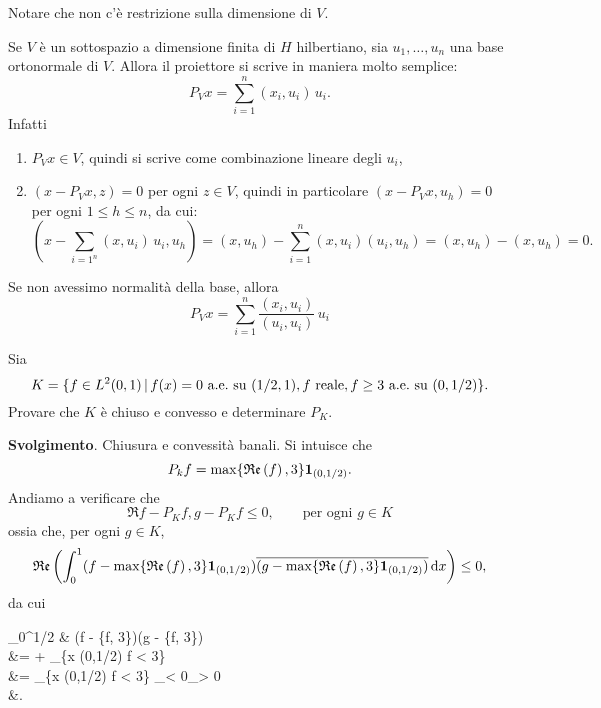 \begin{remark}
	Notare che non c'è restrizione sulla dimensione di $V$.
\end{remark}

\begin{remark}
	Se $V$ è un sottospazio a dimensione finita di $H$ hilbertiano, sia $u_1, \ldots, u_n$ una base ortonormale di $V$. Allora il proiettore si scrive in maniera molto semplice:
	\begin{equation*}
		P_V x = \sum_{i=1}^n (x_i, u_i)\,u_i.
	\end{equation*}
	Infatti
	\begin{enumerate}
		\item $P_V x \in V$, quindi si scrive come combinazione lineare degli $u_i$,
		\item $(x-P_V x, z) = 0$ per ogni $z \in V$, quindi in particolare $(x-P_V x, u_h) = 0$ per ogni $1 \leq h \leq n$, da cui:
		\begin{equation*}
			(x- {\textstyle \sum_{i=1^n}} (x,u_i)\,u_i, u_h) = (x, u_h) - \sum_{i=1}^n (x,u_i)(u_i, u_h) = (x,u_h) - (x, u_h) = 0.
		\end{equation*}
	\end{enumerate}
	Se non avessimo normalità della base, allora
	\begin{equation*}
		P_V x = \sum_{i=1}^n \frac{(x_i, u_i)}{(u_i, u_i)}\,u_i
	\end{equation*}
\end{remark}

\begin{exercise}
	Sia
	\begin{equation*}
		K = \{f \in L^2(0,1) \,|\, f(x) = 0 \ \text{a.e.}\ \text{su $(1/2,1)$}, \text{$f$ reale}, f\geq 3 \ \text{a.e.}\ \text{su $(0,1/2)$}\}.
	\end{equation*}
	Provare che $K$ è chiuso e convesso e determinare $P_K$.

	\textbf{Svolgimento}.
	Chiusura e convessità banali. Si intuisce che
	\begin{equation*}
		P_k f = \max\{\mathfrak{Re}\left(f\right), 3\}{\boldsymbol{1}}_{(0,1/2)}.
	\end{equation*}
	Andiamo a verificare che
	\begin{equation*}
		\Re{f-P_K f, g - P_K f} \leq 0, \qquad \text{per ogni $g \in K$}
	\end{equation*}
	ossia che, per ogni $g \in K$,
	\begin{equation*}
		\mathfrak{Re}\left(\int_0^1 (f- \max\{\mathfrak{Re}\left(f\right), 3\}{\boldsymbol{1}}_{(0,1/2)}) \overline{(g- \max\{\mathfrak{Re}\left(f\right), 3\}{\boldsymbol{1}}_{(0,1/2)})}\,\mathrm{d} x\right) \leq 0,
	\end{equation*}
	da cui
	\begin{eqalign*}
		\int_0^{1/2} & (\Re f - \max \{\Re f, 3\})(g - \max\{\Re f, 3\})\,\dx\\
		&=  + \int_{\{x \in (0,1/2) \suchthat \Re f < 3\}} \\
		&= \int_{\{x \in (0,1/2) \suchthat \Re f < 3\}} _{< 0}_{> 0}\,\dx\\
		&.
	\end{eqalign*}
\end{exercise}
\vspace{1ex}

